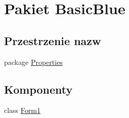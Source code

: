 \hypertarget{namespace_basic_blue}{\section{Pakiet Basic\-Blue}
\label{namespace_basic_blue}
}
\subsection*{Przestrzenie nazw}
\begin{DoxyCompactItemize}
\item 
package \hyperlink{namespace_basic_blue_1_1_properties}{Properties}
\end{DoxyCompactItemize}
\subsection*{Komponenty}
\begin{DoxyCompactItemize}
\item 
class \hyperlink{class_basic_blue_1_1_form1}{Form1}
\end{DoxyCompactItemize}
